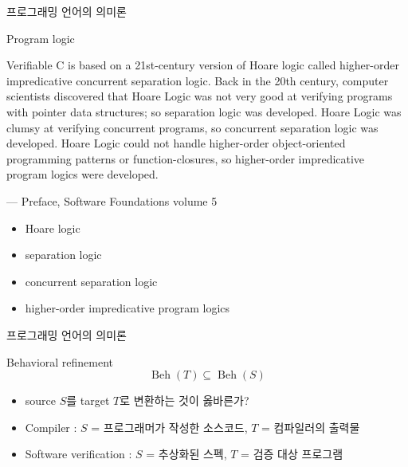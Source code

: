 \documentclass{beamer}
\newcommand\Beh[0]{\operatorname{Beh}}
\begin{document}
\begin{frame}{프로그래밍 언어의 의미론}

  \begin{block}{Program logic}
    \begin{displayquote}
      \footnotesize
      Verifiable C is based on a 21st-century version of Hoare logic called higher-order impredicative concurrent separation logic. Back in the 20th century, computer scientists discovered that Hoare Logic was not very good at verifying programs with pointer data structures; so separation logic was developed. Hoare Logic was clumsy at verifying concurrent programs, so concurrent separation logic was developed. Hoare Logic could not handle higher-order object-oriented programming patterns or function-closures, so higher-order impredicative program logics were developed.
      \par\raggedleft--- Preface, Software Foundations volume 5
    \end{displayquote}

    \begin{itemize}
      \item Hoare logic
      \item separation logic
      \item concurrent separation logic
      \item higher-order impredicative program logics
    \end{itemize}
  \end{block}

\end{frame}

\begin{frame}{프로그래밍 언어의 의미론}

  \begin{block}{Behavioral refinement}
    \[ \Beh(T) \subseteq \Beh(S) \]
    \begin{itemize}
      \item source \(S\)를 target \(T\)로 변환하는 것이 옳바른가?
      \item \footnotesize Compiler : \(S\) = 프로그래머가 작성한 소스코드, \(T\) = 컴파일러의 출력물 \normalsize
      \item \footnotesize Software verification : \(S\) = 추상화된 스펙, \(T\) = 검증 대상 프로그램
    \end{itemize}
  \end{block}

\end{frame}
\end{document}
